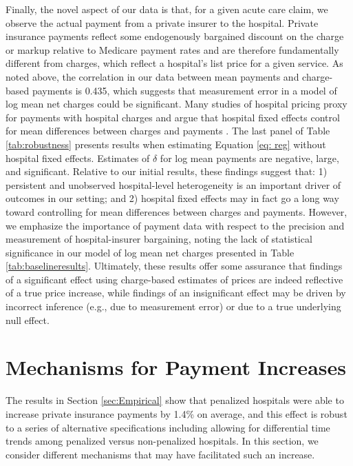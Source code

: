\documentclass[12pt]{article}
\begin{document}
Finally, the novel aspect of our data is that, for a given acute care claim, we observe the actual payment from a private insurer to the hospital. Private insurance payments reflect some endogenously bargained discount on the charge or markup relative to Medicare payment rates and are therefore fundamentally different from charges, which reflect a hospital's list price for a given service. As noted above, the correlation in our data between mean payments and charge-based payments is 0.435, which suggests that measurement error in a model of log mean net charges could be significant. Many studies of hospital pricing proxy for payments with hospital charges and argue that hospital fixed effects control for mean differences between charges and payments \citep{cutler2000}. The last panel of Table \ref{tab:robustness} presents results when estimating Equation \ref{eq: reg} without hospital fixed effects.  Estimates of $\delta$ for log mean payments are negative, large, and significant. Relative to our initial results, these findings suggest that: 1) persistent and unobserved hospital-level heterogeneity is an important driver of outcomes in our setting; and 2) hospital fixed effects may in fact go a long way toward controlling for mean differences between charges and payments. However, we emphasize the importance of payment data with respect to the precision and measurement of hospital-insurer bargaining, noting the lack of statistical significance in our model of log mean net charges presented in Table \ref{tab:baselineresults}. Ultimately, these results offer some assurance that findings of a significant effect using charge-based estimates of prices are indeed reflective of a true price increase, while findings of an insignificant effect may be driven by incorrect inference (e.g., due to measurement error) or due to a true underlying null effect.

\section{Mechanisms for Payment Increases}
\label{sec:alt}
The results in Section \ref{sec:Empirical} show that penalized hospitals were able to increase private insurance payments by 1.4\% on average, and this effect is robust to a series of alternative specifications including allowing for differential time trends among penalized versus non-penalized hospitals. In this section, we consider different mechanisms that may have facilitated such an increase.
\end{document}
